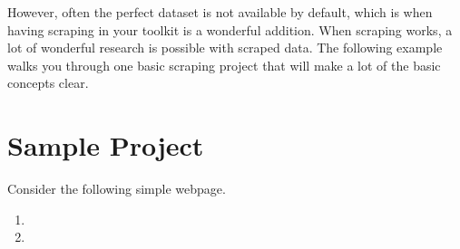 \documentclass[12pt]{article}
\begin{document}
However, often the perfect dataset is not available by default, which is when having scraping in your toolkit is a wonderful addition. When scraping works, a lot of wonderful research is possible with scraped data. The following example walks you through one basic scraping project that will make a lot of the basic concepts clear.

\section{Sample Project}

Consider the following simple webpage. 

\begin{enumerate}
\item 
\item 


\end{enumerate}
\end{document}
